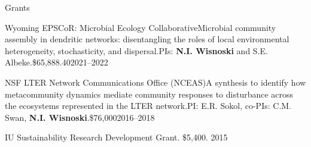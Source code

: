 \documentclass{resume} %
\begin{document}
\bigskip


\begin{rSection}{Grants}

\begin{Grant}{Wyoming EPSCoR: Microbial Ecology Collaborative}{Microbial community assembly in dendritic networks: disentangling the roles of local environmental heterogeneity, stochasticity, and dispersal.}{PIs: {\bf N.I. Wisnoski} and S.E. Albeke.}{\$65,888.40}{2021--2022}
\end{Grant}

\begin{Grant}{NSF LTER Network Communications Office (NCEAS)}{A synthesis to identify how metacommunity dynamics mediate community responses to disturbance across the ecosystems represented in the LTER network.}{PI: E.R. Sokol, co-PIs: C.M. Swan, {\bf N.I. Wisnoski}.}{\$76,000}{2016--2018}
\end{Grant}


IU Sustainability Research Development Grant. \$5,400. 2015


\end{rSection}

\bigskip
\end{document}
